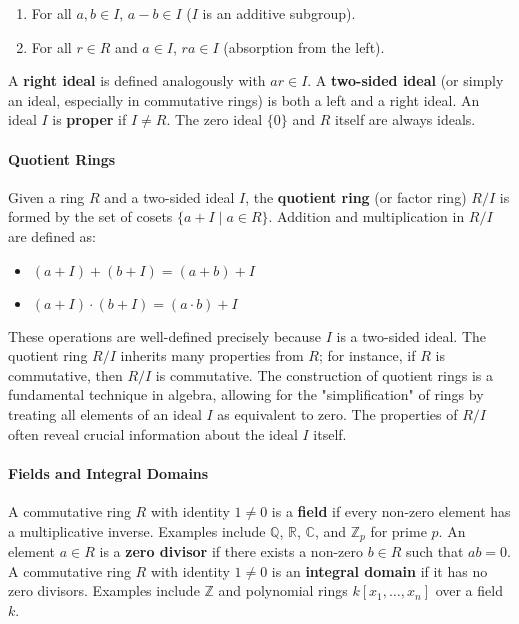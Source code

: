 \documentclass[12pt]{article}
\theoremstyle{definition}
\numberwithin{equation}{subsection}
\begin{document}
\begin{enumerate}
  \item For all $a,b\in I$, $a-b\in I$ ($I$ is an additive subgroup).
  \item For all $r\in R$ and $a\in I$, $ra\in I$ (absorption from the left).
\end{enumerate}

A \textbf{right ideal} is defined analogously with $ar\in I$. A \textbf{two-sided ideal} (or simply an ideal, especially in commutative rings) is both a left and a right ideal. An ideal $I$ is \textbf{proper} if $I\neq R$. The zero ideal $\{0\}$ and $R$ itself are always ideals.

\paragraph{Quotient Rings}
Given a ring $R$ and a two-sided ideal $I$, the \textbf{quotient ring} (or factor ring) $R/I$ is formed by the set of cosets $\{a+I\mid a\in R\}$. Addition and multiplication in $R/I$ are defined as:

\begin{itemize}
  \item $(a+I)+(b+I)=(a+b)+I$
  \item $(a+I)\cdot(b+I)=(a\cdot b)+I$
\end{itemize}

These operations are well-defined precisely because $I$ is a two-sided ideal. The quotient ring $R/I$ inherits many properties from $R$; for instance, if $R$ is commutative, then $R/I$ is commutative. The construction of quotient rings is a fundamental technique in algebra, allowing for the "simplification" of rings by treating all elements of an ideal $I$ as equivalent to zero. The properties of $R/I$ often reveal crucial information about the ideal $I$ itself.

\paragraph{Fields and Integral Domains}
A commutative ring $R$ with identity $1 \neq 0$ is a \textbf{field} if every non-zero element has a multiplicative inverse. Examples include $\mathbb{Q}$, $\mathbb{R}$, $\mathbb{C}$, and $\mathbb{Z}_p$ for prime $p$.
An element $a \in R$ is a \textbf{zero divisor} if there exists a non-zero $b \in R$ such that $ab=0$. A commutative ring $R$ with identity $1 \neq 0$ is an \textbf{integral domain} if it has no zero divisors. Examples include $\mathbb{Z}$ and polynomial rings $k[x_1, \ldots, x_n]$ over a field $k$.
\end{document}
